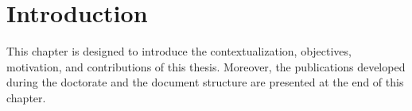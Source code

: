 
\chapter{Introduction} \label{chap:introduction}

This chapter is designed to introduce the contextualization, objectives, motivation, and contributions of this thesis. Moreover, the publications developed during the doctorate and the document structure are presented at the end of this chapter.








